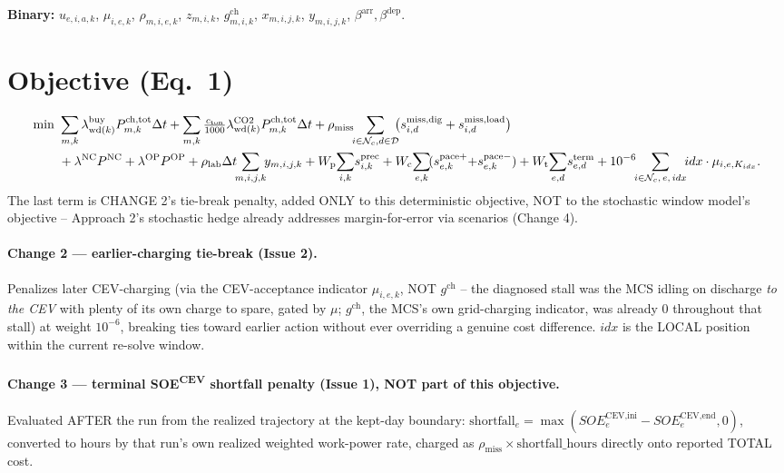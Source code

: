 \documentclass[11pt]{article}
\newcommand{\dt}{\Delta t}
\begin{document}
\smallskip
\textbf{Binary:} $u_{e,i,a,k}$, $\mu_{i,e,k}$, $\rho_{m,i,e,k}$, $z_{m,i,k}$,
$g^{\text{ch}}_{m,i,k}$, $x_{m,i,j,k}$, $y_{m,i,j,k}$, $\beta^{\text{arr}},\beta^{\text{dep}}$.

\section{Objective (Eq.\ 1)}
\begin{align}
\min\ &\sum_{m,k}\lambda^{\text{buy}}_{\mathrm{wd}(k)}P^{\text{ch,tot}}_{m,k}\dt
      +\sum_{m,k}\tfrac{c_{\text{ton}}}{1000}\lambda^{\text{CO2}}_{\mathrm{wd}(k)}P^{\text{ch,tot}}_{m,k}\dt
      +\rho_{\text{miss}}\!\!\sum_{i\in\mathcal{N}_c,d\in\mathcal{D}}\!\!\bigl(s^{\text{miss,dig}}_{i,d}+s^{\text{miss,load}}_{i,d}\bigr)\notag\\
     &+\lambda^{\text{NC}}P^{\text{NC}}+\lambda^{\text{OP}}P^{\text{OP}}
      +\rho_{\text{lab}}\dt\!\!\sum_{m,i,j,k}\!\! y_{m,i,j,k}
      + W_{\text{p}}\!\sum_{i,k}\! s^{\text{prec}}_{i,k}
      + W_{\text{c}}\!\sum_{e,k}\!(s^{\text{pace}+}_{e,k}{+}s^{\text{pace}-}_{e,k})
      + W_{\text{t}}\!\sum_{e,d}\! s^{\text{term}}_{e,d}
      +10^{-6}\!\!\sum_{i\in\mathcal{N}_c,\,e,\,idx}\!\! idx\cdot \mu_{i,e,K_{idx}}.
\end{align}
The last term is CHANGE 2's tie-break penalty, added ONLY to this deterministic objective, NOT to
the stochastic window model's objective -- Approach 2's stochastic hedge already addresses
margin-for-error via scenarios (Change 4).

\paragraph{Change 2 --- earlier-charging tie-break (Issue 2).} Penalizes later CEV-charging (via
the CEV-acceptance indicator $\mu_{i,e,k}$, NOT $g^{\text{ch}}$ -- the diagnosed stall was the MCS
idling on discharge \emph{to the CEV} with plenty of its own charge to spare, gated by $\mu$;
$g^{\text{ch}}$, the MCS's own grid-charging indicator, was already 0 throughout that stall) at
weight $10^{-6}$, breaking ties toward earlier action without ever overriding a genuine cost
difference. $idx$ is the LOCAL position within the current re-solve window.

\paragraph{Change 3 --- terminal SOE\textsuperscript{CEV} shortfall penalty (Issue 1), NOT part of
this objective.} Evaluated AFTER the run from the realized trajectory at the kept-day boundary:
$\text{shortfall}_e=\max(SOE^{\text{CEV,ini}}_e-SOE^{\text{CEV,end}}_e,0)$, converted to hours by
that run's own realized weighted work-power rate, charged as
$\rho_{\text{miss}}\times\text{shortfall\_hours}$ directly onto reported TOTAL cost.
\end{document}

